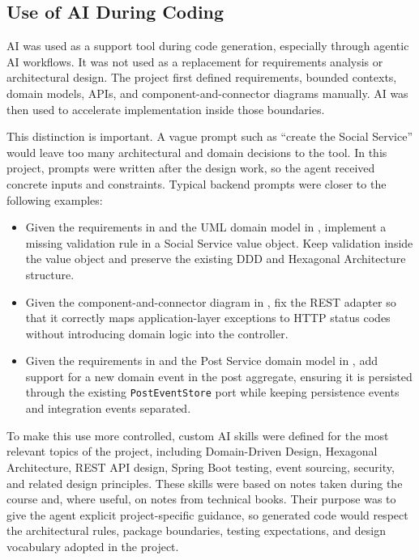 \documentclass[12pt,a4paper]{article}
\begin{document}
\subsection{Use of AI During Coding}

AI was used as a support tool during code generation, especially through agentic AI workflows. It was not used as a replacement for requirements analysis or architectural design. The project first defined requirements, bounded contexts, domain models, APIs, and component-and-connector diagrams manually. AI was then used to accelerate implementation inside those boundaries.

This distinction is important. A vague prompt such as ``create the Social Service'' would leave too many architectural and domain decisions to the tool. In this project, prompts were written after the design work, so the agent received concrete inputs and constraints. Typical backend prompts were closer to the following examples:

\begin{itemize}
    \item Given the requirements in  and the UML domain model in , implement a missing validation rule in a Social Service value object. Keep validation inside the value object and preserve the existing DDD and Hexagonal Architecture structure.

    \item Given the component-and-connector diagram in , fix the REST adapter so that it correctly maps application-layer exceptions to HTTP status codes without introducing domain logic into the controller.

    \item Given the requirements in  and the Post Service domain model in , add support for a new domain event in the post aggregate, ensuring it is persisted through the existing \texttt{PostEventStore} port while keeping persistence events and integration events separated.
\end{itemize}

To make this use more controlled, custom AI skills were defined for the most relevant topics of the project, including Domain-Driven Design, Hexagonal Architecture, REST API design, Spring Boot testing, event sourcing, security, and related design principles. These skills were based on notes taken during the course and, where useful, on notes from technical books. Their purpose was to give the agent explicit project-specific guidance, so generated code would respect the architectural rules, package boundaries, testing expectations, and design vocabulary adopted in the project.
\end{document}
